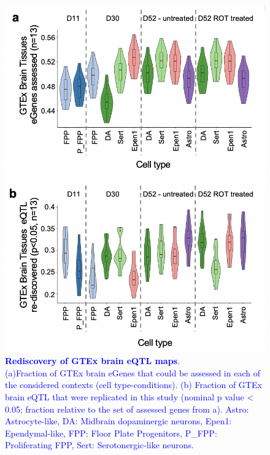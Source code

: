 \begin{figure}[h]
\centering
\includegraphics[width=13cm]{Chapter5/Fig/neuroseq_rediscovering_gtex_brain.png}
\caption[Rediscovery of GTEx brain eQTL maps]{\textcolor{blue}{\textbf{Rediscovery of GTEx brain eQTL maps}.\\
(a)Fraction of GTEx brain eGenes that could be assessed in each of the considered contexts (cell type-conditions). 
(b) Fraction of GTEx brain eQTL that were replicated in this study (nominal p value < 0.05; fraction relative to the set of assessed genes from a).
Astro: Astrocyte-like, DA: Midbrain dopaminergic neurons, Epen1: Ependymal-like, FPP: Floor Plate Progenitors, P\_FPP: Proliferating FPP, Sert: Serotonergic-like neurons.}}
\label{fig:neuroseq_and_gtex_rediscovery}
\end{figure}




